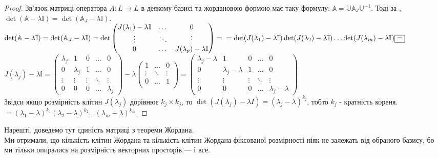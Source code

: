 \documentclass{math_library}
\begin{document}
\begin{proof}
Зв'язок матриці оператора $A: L \to L$ в деякому базисі та жордановою формою має таку формулу: $\mathbb{A} = \mathbb{U} \mathbb{A}_J \mathbb{U}^{-1}$. Тоді за , $\det (\mathbb{A}-\lambda \mathbb{I}) = \det (\mathbb{A}_J -\lambda \mathbb{I})$.\\
$\det (\mathbb{A} - \lambda \mathbb{I}) = \det (\mathbb{A}_{J} - \lambda \mathbb{I}) = \det \begin{pmatrix}
J(\lambda_1) - \lambda \mathbb{I} & \dots & 0 \\
\vdots & \ddots & \vdots \\
0 & \dots & J(\lambda_p) - \lambda \mathbb{I}
\end{pmatrix} = \\ = \det(J(\lambda_1)-\lambda \mathbb{I}) \det(J(\lambda_2)-\lambda \mathbb{I}) \dots \det(J(\lambda_m)-\lambda \mathbb{I}) \boxed{=} \\
$
$J(\lambda_j)-\lambda \mathbb{I} = \begin{pmatrix}
\lambda_j & 1 & 0 & \dots & 0 \\
0 & \lambda_j & 1 & \dots & 0 \\
\vdots & \vdots & \vdots & \ddots & \vdots \\
0 & 0 & 0 & \dots & \lambda_j
\end{pmatrix} - \lambda \begin{pmatrix}
1 & \dots & 0 \\
\vdots & \ddots & \vdots \\
0 & \dots & 1 \\
\end{pmatrix} = \begin{pmatrix}
\lambda_j - \lambda & 1 & 0 & \dots & 0 \\
0 & \lambda_j - \lambda & 1 & \dots & 0 \\
\vdots & \vdots & \vdots & \ddots & \vdots \\
0 & 0 & 0 & \dots & \lambda_j - \lambda
\end{pmatrix}$\\
Звідси якщо розмірність клітин $J(\lambda_j)$ дорівнює $k_j \times k_j$, то $\det (J(\lambda_j) - \lambda I) = (\lambda_j - \lambda)^{k_j}$, тобто $k_j$ - кратність кореня.\\
$\boxed{=} (\lambda_1-\lambda)^{k_1}(\lambda_2-\lambda)^{k_2} \dots (\lambda_m-\lambda)^{k_m}$.
\end{proof}
\fi

\begin{remark}
Нарешті, доведемо тут єдиність матриці з теореми Жордана.\\
Ми отримали, що кількість клітин Жордана та кількість клітин Жордана фіксованої розмірності ніяк не залежать від обраного базису, бо ми тільки опирались на розмірність векторних просторів --- і все.
\end{remark}
\end{document}
